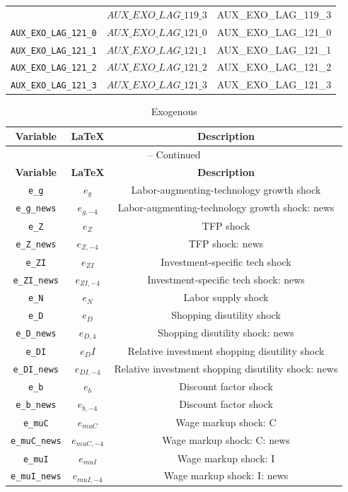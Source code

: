 \begin{center}
\begin{longtable}{ccc}
{\texttt{AUX\_EXO\_LAG\_119\_3} & $AUX\_EXO\_LAG\_119\_3$ & AUX\_EXO\_LAG\_119\_3\\
\texttt{AUX\_EXO\_LAG\_121\_0} & $AUX\_EXO\_LAG\_121\_0$ & AUX\_EXO\_LAG\_121\_0\\
\texttt{AUX\_EXO\_LAG\_121\_1} & $AUX\_EXO\_LAG\_121\_1$ & AUX\_EXO\_LAG\_121\_1\\
\texttt{AUX\_EXO\_LAG\_121\_2} & $AUX\_EXO\_LAG\_121\_2$ & AUX\_EXO\_LAG\_121\_2\\
\texttt{AUX\_EXO\_LAG\_121\_3} & $AUX\_EXO\_LAG\_121\_3$ & AUX\_EXO\_LAG\_121\_3\\
\hline%
\end{longtable}
\end{center}
\begin{center}
\begin{longtable}{ccc}
\caption{Exogenous}\\%
\hline%
\multicolumn{1}{c}{\textbf{Variable}} &
\multicolumn{1}{c}{\textbf{\LaTeX}} &
\multicolumn{1}{c}{\textbf{Description}}\\%
\hline\hline%
\endfirsthead
\multicolumn{3}{c}{{\tablename} \thetable{} -- Continued}\\%
\hline%
\multicolumn{1}{c}{\textbf{Variable}} &
\multicolumn{1}{c}{\textbf{\LaTeX}} &
\multicolumn{1}{c}{\textbf{Description}}\\%
\hline\hline%
\endhead
\texttt{e\_g} & ${e_g}$ & Labor-augmenting-technology growth shock\\
\texttt{e\_g\_news} & ${e_{g,-4}}$ & Labor-augmenting-technology growth shock: news\\
\texttt{e\_Z} & ${e_Z}$ & TFP shock\\
\texttt{e\_Z\_news} & ${e_{Z,-4}}$ & TFP shock: news\\
\texttt{e\_ZI} & ${e_{ZI}}$ & Investment-specific tech shock\\
\texttt{e\_ZI\_news} & ${e_{ZI,-4}}$ & Investment-specific tech shock: news\\
\texttt{e\_N} & ${e_N}$ & Labor supply shock\\
\texttt{e\_D} & ${e_D}$ & Shopping disutility shock\\
\texttt{e\_D\_news} & ${e_{D,4}}$ & Shopping disutility shock: news\\
\texttt{e\_DI} & ${e_DI}$ & Relative investment shopping disutility shock\\
\texttt{e\_DI\_news} & ${e_{DI,-4}}$ & Relative investment shopping disutility shock: news\\
\texttt{e\_b} & ${e_b}$ & Discount factor shock\\
\texttt{e\_b\_news} & ${e_{b,-4}}$ & Discount factor shock\\
\texttt{e\_muC} & ${e_{muC}}$ & Wage markup shock: C\\
\texttt{e\_muC\_news} & ${e_{muC,-4}}$ & Wage markup shock: C: news\\
\texttt{e\_muI} & ${e_{muI}}$ & Wage markup shock: I\\
\texttt{e\_muI\_news} & ${e_{muI,-4}}$ & Wage markup shock: I: news\\
\hline%
\end{longtable}
\end{center}
